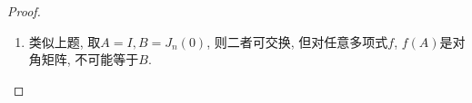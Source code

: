 \documentclass{ctexart}
\begin{document}
\begin{proof}
\begin{enumerate}
\begin{align*}
\begin{bmatrix}
					b_{n1} & b_{n2} & \cdots & b_{nn}\\
				\end{bmatrix}\begin{bmatrix}
					& 1\\ && \ddots \\ &&& 1\\ \\
				\end{bmatrix}
				=\begin{bmatrix}
                    & b_{11} & b_{12} & \cdots \\
                    & 	b_{21} & b_{22} & \cdots \\
                    & 	\vdots & \vdots &   \\
                    & 	b_{n1} & b_{n2} & \cdots \\
                    \end{bmatrix}
			\end{align*}
			比较得到
			\[
				B=\begin{bmatrix}
				b_{11} & b_{12} & \cdots & b_{1n}\\
				 & b_{11} & \cdots & b_{1,n-1}\\
				 &  & \ddots & \vdots \\
				 &  &  & b_{11}\\
			 \end{bmatrix}=b_{11}I+b_{12}J_n(0)+\dots+b_{1n}J_n(0)^{n-1}
			 =b_{11}I+b_{12}(A-\lambda I)+\dots +b_{1n}(A-\lambda I)^{n-1}
			 .
			\]
		 \item 类似上题, 取$A=I,B=J_n(0)$, 则二者可交换, 但对任意多项式$f$, $f(A)$是对角矩阵, 不可能等于$B$. 
	\end{enumerate}
\end{proof}
\end{document}
